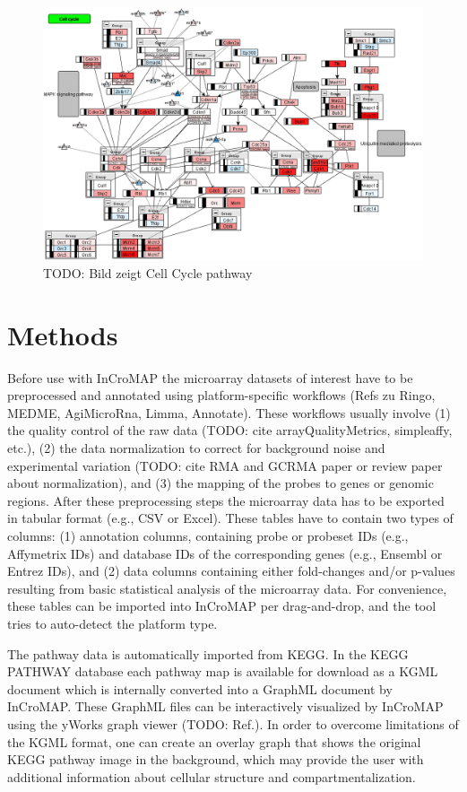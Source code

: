 \documentclass{bioinfo}
\begin{document}
\begin{figure}[tb]
\centering
\includegraphics[width=.5\textwidth]{figures/mmu04110.png}
\caption{
TODO: Bild zeigt Cell Cycle pathway}\label{fig:cellcycle}
\end{figure}

\section{Methods}

Before use with InCroMAP the microarray datasets of interest have to be preprocessed and annotated
using platform-specific workflows (Refs zu Ringo, MEDME, AgiMicroRna, Limma, Annotate). These
workflows usually involve (1) the quality control of the raw data (TODO: cite arrayQualityMetrics,
simpleaffy, etc.), (2) the data normalization to correct for background noise and experimental
variation (TODO: cite RMA and GCRMA paper or review paper about normalization), and (3) the mapping
of the probes to genes or genomic regions. After these preprocessing steps the microarray data has
to be exported in tabular format (e.g., CSV or Excel). These tables have to contain two types of
columns: (1) annotation columns, containing probe or probeset IDs (e.g., Affymetrix IDs) and
database IDs of the corresponding genes (e.g., Ensembl or Entrez IDs), and (2) data columns
containing either fold-changes and/or p-values resulting from basic statistical analysis of the
microarray data. For convenience, these tables can be imported into InCroMAP per drag-and-drop, and
the tool tries to auto-detect the platform type.

The pathway data is automatically imported from KEGG. In the KEGG PATHWAY database each pathway map
is available for download as a KGML document which is internally converted into a GraphML document
by InCroMAP. These GraphML files can be interactively visualized by InCroMAP using the yWorks graph
viewer (TODO: Ref.). In order to overcome limitations of the KGML format, one can create an overlay
graph that shows the original KEGG pathway image in the background, which may provide the user with
additional information about cellular structure and compartmentalization.
\end{document}
